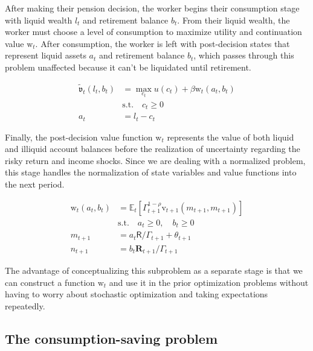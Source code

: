 \documentclass{article}
\newcommand{\DiscFac}{\beta}
\newcommand{\util}{u}
\newcommand{\tShkEmp}{\theta}
\newcommand{\Ex}{\mathbb{E}}
\newcommand{\CRRA}{\rho}
\newcommand{\bRat}{b}
\newcommand{\cRat}{c}
\newcommand{\vFunc}{\mathrm{v}}
\newcommand{\Rfree}{\mathsf{R}}
\newcommand{\PGro}{\Gamma}
\newcommand{\aRat}{a}
\newcommand{\mRat}{m}
\newcommand{\Risky}{\mathbf{R}}
\newcommand{\vOpt}{\tilde{\mathfrak{v}}}
\newcommand{\nRat}{n}
\newcommand{\lRat}{l}
\newcommand{\wFunc}{\mathrm{w}}
\begin{document}
After making their pension decision, the worker begins their consumption stage with liquid wealth $\lRat_{t}$ and retirement balance $\bRat_{t}$. From their liquid wealth, the worker must choose a level of consumption to maximize utility and continuation value $\wFunc_{t}$. After consumption, the worker is left with post-decision states that represent liquid assets $\aRat_{t}$ and retirement balance $\bRat_{t}$, which passes through this problem unaffected because it can't be liquidated until retirement.

\begin{equation}
\begin{split}
    \vOpt_{t}(\lRat_{t}, \bRat_{t}) & = \max_{\cRat_{t}} \util(\cRat_{t}) + \DiscFac \wFunc_{t}(\aRat_{t}, \bRat_{t})  \\
    & \text{s.t.} \quad \cRat_{t} \ge 0 \\
    \aRat_{t} & = \lRat_{t} - \cRat_{t}
  \end{split}
\end{equation}

Finally, the post-decision value function $\wFunc_{t}$ represents the value of both liquid and illiquid account balances before the realization of uncertainty regarding the risky return and income shocks. Since we are dealing with a normalized problem, this stage handles the normalization of state variables and value functions into the next period.

\begin{equation}
\begin{split}
    \wFunc_{t}(\aRat_{t}, \bRat_{t}) & = \Ex_{t} \left[ \PGro_{t+1}^{1-\CRRA} \vFunc_{t+1}(\mRat_{t+1}, \mRat_{t+1}) \right] \\
    & \text{s.t.} \quad \aRat_{t} \ge 0, \quad \bRat_{t} \ge 0 \\
    \mRat_{t+1} & = \aRat_{t} \Rfree / \PGro_{t+1}  + \tShkEmp_{t+1} \\
    \nRat_{t+1} & = \bRat_{t} \Risky_{t+1} /  \PGro_{t+1}
  \end{split}
\end{equation}

The advantage of conceptualizing this subproblem as a separate stage is that we can construct a function $\wFunc_{t}$ and use it in the prior optimization problems without having to worry about stochastic optimization and taking expectations repeatedly.

\subsection{The consumption-saving problem}\label{The consumption-saving problem}
\end{document}
